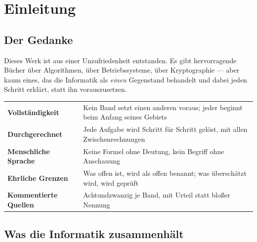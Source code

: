\chapter{Einleitung}

\section{Der Gedanke}

Dieses Werk ist aus einer Unzufriedenheit entstanden. Es gibt hervorragende Bücher über Algorithmen, über Betriebssysteme, über Kryptographie --- aber kaum eines, das die Informatik als \emph{einen} Gegenstand behandelt und dabei jeden Schritt erklärt, statt ihn vorauszusetzen.

\begin{merksatz}
\begin{center}
\renewcommand{\arraystretch}{1.5}
\begin{tabular}{@{}P{3.0cm}P{6.0cm}@{}}
\toprule
\textbf{Vollständigkeit} & Kein Band setzt einen anderen voraus; jeder beginnt beim Anfang seines Gebiets\\
\textbf{Durchgerechnet} & Jede Aufgabe wird Schritt für Schritt gelöst, mit allen Zwischenrechnungen\\
\textbf{Menschliche Sprache} & Keine Formel ohne Deutung, kein Begriff ohne Anschauung\\
\textbf{Ehrliche Grenzen} & Was offen ist, wird als offen benannt; was überschätzt wird, wird geprüft\\
\textbf{Kommentierte Quellen} & Achtundzwanzig je Band, mit Urteil statt bloßer Nennung\\
\bottomrule
\end{tabular}
\end{center}

\begin{center}
\begin{minipage}{0.88\textwidth}
\end{minipage}
\end{center}
\end{merksatz}

\section{Was die Informatik zusammenhält}

